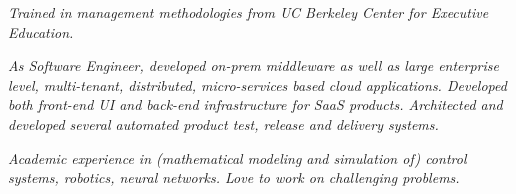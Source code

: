 

{\selectfont
	\begin{justify}\textit{Trained in management methodologies from UC Berkeley Center for Executive Education.}\end{justify}
}
{\selectfont
	\begin{justify}\textit{As Software Engineer, developed on-prem middleware as well as large enterprise level, multi-tenant, distributed, micro-services based cloud applications. Developed both front-end UI and back-end infrastructure for SaaS products. Architected and developed several automated product test, release and delivery systems.}\end{justify}
}

{\selectfont
	\begin{justify}\textit{Academic experience in (mathematical modeling and simulation of) control systems, robotics, neural networks. Love to work on challenging problems.}\end{justify}
}